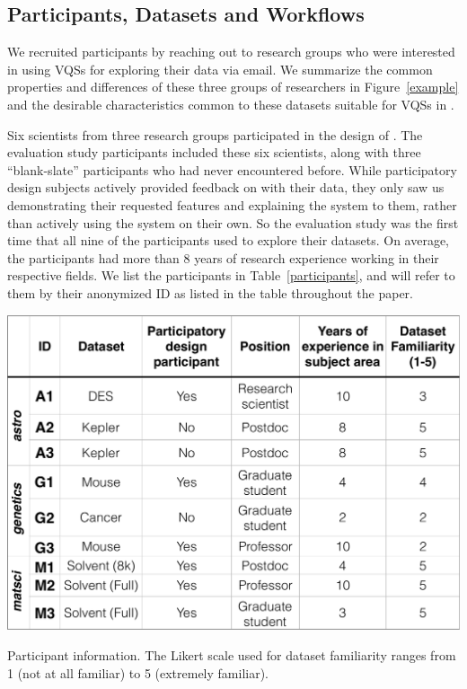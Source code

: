 \subsection{Participants, Datasets and Workflows}
We recruited participants by reaching out to research groups who were interested in using VQSs for exploring their data via email.  We summarize the common properties and differences of these three groups of researchers in Figure~\ref{example} and the desirable characteristics common to these datasets suitable for VQSs in .
\par Six scientists from three research groups participated in the design of \zv. The evaluation study participants included these six scientists, along with three ``blank-slate'' participants who had never encountered \zv before. While participatory design subjects actively provided feedback on \zv with their data, they only saw us demonstrating their requested features and explaining the system to them, rather than actively using the system on their own. So the evaluation study was the first time that all nine of the participants used \zv to explore their datasets. On average, the participants had more than 8 years of research experience working in their respective fields. We list the participants in Table~\ref{participants}, and will refer to them by their anonymized ID as listed in the table throughout the paper. 
\begin{table}[h]
\centering
\vspace{-10pt}
\includegraphics[width=\linewidth]{figures/participants.pdf}
\caption{Participant information. The Likert scale used for dataset familiarity ranges from 1 (not at all familiar) to 5 (extremely familiar).}
\label{participants}
\vspace{-10pt}
\end{table}
